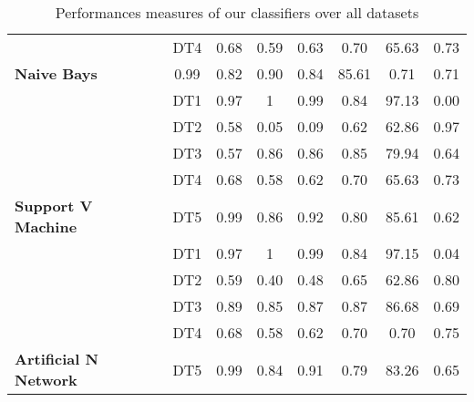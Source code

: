 \begin{table}
\begin{tabular}{|l|c|c|c|c|c|c|c|}
  &DT4 &0.68 &0.59&0.63&0.70&65.63&0.73\\
  \cline{2-8}
\multirow{-4}{*}{ \textbf{Naive Bays}}&0.99 &0.82&0.90&0.84&85.61&0.71&0.71\\
\hline
\cline{2-8}
&DT1 &0.97 &1   &0.99 &0.84 &97.13&0.00 \\
\cline{2-8}
  &DT2 &0.58  &0.05   & 0.09&0.62&62.86&0.97\\
  \cline{2-8}
  &DT3 &0.57 & 0.86&0.86&0.85&79.94&0.64\\
  \cline{2-8}
 & DT4 & 0.68&0.58&0.62&0.70&65.63&0.73\\
 \cline{2-8}
 \multirow{-4}{*}{ \textbf{Support V Machine}}& DT5 &0.99 &0.86&0.92&0.80&85.61&0.62\\
 \hline
\cline{2-8}
&DT1 &0.97&1 &0.99   &0.84 &97.15&0.04  \\
\cline{2-8}
&  DT2 &0.59  &0.40   &0.48&0.65&62.86&0.80 \\
\cline{2-8}
 & DT3 &0.89 &0.85 &0.87&0.87&86.68&0.69\\
 \cline{2-8}
 & DT4 &0.68 &0.58&0.62&0.70&0.70&0.75\\
  \cline{2-8}
  \multirow{-4}{*}{ \textbf{ Artificial N Network}}&DT5 &0.99 &0.84&0.91&0.79&83.26&0.65\\ 
  \hline
\end{tabular}
\caption{Performances measures of our classifiers over all datasets}
\end{table}